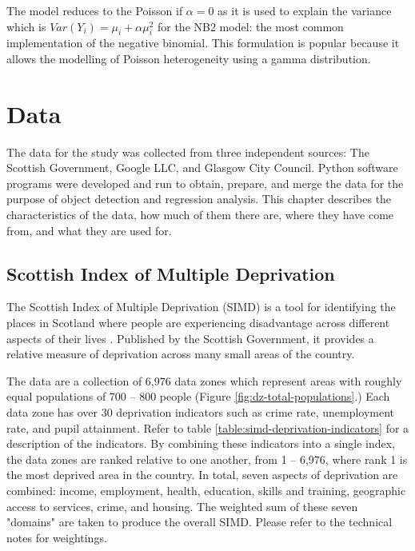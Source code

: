 \documentclass{thesis}
\begin{document}
The model reduces to the Poisson if $\alpha = 0$ as it is used to explain the variance which is $Var(Y_i) = \mu_i + \alpha\mu_i^2$ for the NB2 model: the most common implementation of the negative binomial\cite{cameron_trivedi_2013}. This formulation is popular because it allows the modelling of Poisson heterogeneity using a gamma distribution\cite{ncss-neg-bin}.


\chapter{Data} \label{chapter:data}

The data for the study was collected from three independent sources: The Scottish Government, Google LLC, and Glasgow City Council. Python software programs were developed and run to obtain, prepare, and merge the data for the purpose of object detection and regression analysis. This chapter describes the characteristics of the data, how much of them there are, where they have come from, and what they are used for.

\section{Scottish Index of Multiple Deprivation}

The Scottish Index of Multiple Deprivation (SIMD) is a tool for identifying the places in Scotland where people are experiencing disadvantage across different aspects of their lives \cite{simd}. Published by the Scottish Government, it provides a relative measure of deprivation across many small areas of the country.

The data are a collection of 6,976 data zones which represent areas with roughly equal populations of 700 -- 800 people (Figure \ref{fig:dz-total-populations}.) Each data zone has over 30 deprivation indicators such as crime rate, unemployment rate, and pupil attainment. Refer to table \ref{table:simd-deprivation-indicators} for a description of the indicators. By combining these indicators into a single index, the data zones are ranked relative to one another, from 1 -- 6,976, where rank 1 is the most deprived area in the country. In total, seven aspects of deprivation are combined: income, employment, health, education, skills and training, geographic access to services, crime, and housing. The weighted sum of these seven "domains" are taken to produce the overall SIMD. Please refer to the technical notes\cite{simd-technical-notes} for weightings.
\end{document}
